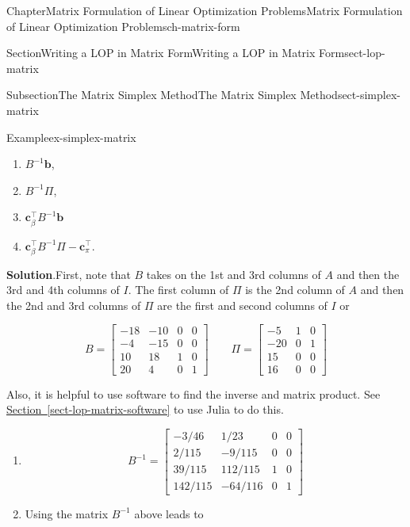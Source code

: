 \documentclass[oneside,10pt,]{book}
\newcommand{\blocktitlefont}{\relax}
\newcommand{\xreffont}{\relax}
\numberwithin{equation}{section}
\newcommand{\amp}{&}
\begin{document}
\begin{chapterptx}{Chapter}{Matrix Formulation of Linear Optimization Problems}{}{Matrix Formulation of Linear Optimization Problems}{}{}{ch-matrix-form}
\begin{sectionptx}{Section}{Writing a LOP in Matrix Form}{}{Writing a LOP in Matrix Form}{}{}{sect-lop-matrix}
\begin{subsectionptx}{Subsection}{The Matrix Simplex Method}{}{The Matrix Simplex Method}{}{}{sect-simplex-matrix}
\begin{example}{Example}{}{ex-simplex-matrix}
\begin{enumerate}
\item{}\(B^{-1}\boldsymbol{b}\),%
\item{}\(B^{-1}\Pi\),%
\item{}\(\displaystyle \boldsymbol{c}_{\beta}^{\intercal}B^{-1}\boldsymbol{b}\)%
\item{}\(\boldsymbol{c}_{\beta}^{\intercal}B^{-1}\Pi - \boldsymbol{c}_{\pi}^{\intercal}\).%
\end{enumerate}
%
\par\smallskip%
\noindent\textbf{\blocktitlefont Solution}.\hypertarget{ex-simplex-matrix-2}{}\quad{}First, note that \(B\) takes on the 1st and 3rd columns of \(A\) and then the 3rd and 4th columns of \(I\). The first column of \(\Pi\) is the 2nd column of \(A\) and then the 2nd and 3rd columns of \(\Pi\) are the first and second columns of \(I\) or%
\par
%
\begin{equation*}
B = \begin{bmatrix} -18 \amp -10 \amp 0 \amp 0 \\ -4 \amp -15 \amp 0 \amp 0 \\ 10 \amp 18 \amp 1 \amp 0 \\ 20 \amp 4 \amp 0 \amp 1 \end{bmatrix} \qquad \Pi = \begin{bmatrix} -5 \amp 1 \amp 0 \\ -20 \amp 0 \amp 1 \\ 15 \amp 0 \amp 0 \\ 16 \amp 0 \amp 0 \end{bmatrix}
\end{equation*}
%
\par
Also, it is helpful to use software to find the inverse and matrix product. See \hyperref[sect-lop-matrix-software]{Section~{\xreffont\ref{sect-lop-matrix-software}}} to use Julia to do this.%
\par
%
\begin{enumerate}
\item{}%
\begin{equation*}
B^{-1} = \begin{bmatrix} -3/46 \amp 1/23 \amp 0 \amp 0 \\ 2/115 \amp -9/115 \amp 0 \amp 0 \\ 39/115 \amp 112/115 \amp 1 \amp 0 \\ 142/115 \amp -64/116 \amp 0 \amp 1 \end{bmatrix}
\end{equation*}
%
\item{}Using the matrix \(B^{-1}\) above leads to%

\end{enumerate}
\end{example}
\end{subsectionptx}
\end{sectionptx}
\end{chapterptx}
\end{document}

